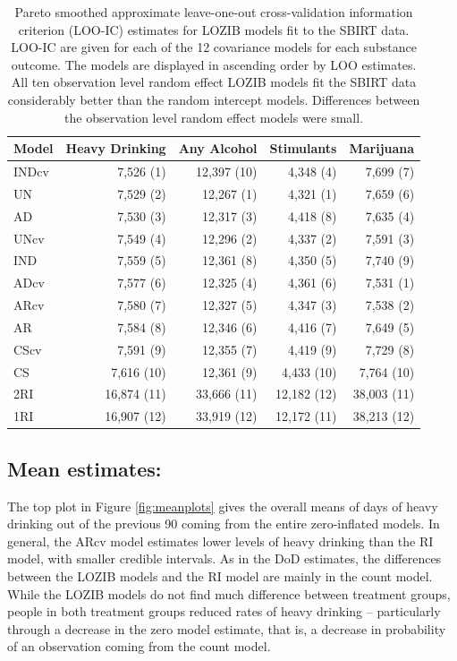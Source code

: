 \documentclass[12pt]{article}
\begin{document}
\begin{table}
	\caption{Pareto smoothed approximate leave-one-out cross-validation information criterion (LOO-IC) estimates for LOZIB models fit to the SBIRT data. LOO-IC are given for each of the 12 covariance models for each substance outcome. The models are displayed in ascending order by LOO estimates. All ten observation level random effect LOZIB models fit the SBIRT data considerably better than the random intercept models. Differences between the observation level random effect models were small.}
	\centering
	\begin{tabular}[t]{lrrrr}
		\toprule
		Model & Heavy Drinking & Any Alcohol& Stimulants & Marijuana\\
		\midrule
		INDcv & 7,526 (1) & 12,397 (10) & 4,348 (4) & 7,699 (7)\\
		UN & 7,529 (2) & 12,267 (1) & 4,321 (1) & 7,659 (6)\\
		AD & 7,530 (3) & 12,317 (3) & 4,418 (8) & 7,635 (4)\\
		UNcv & 7,549 (4) & 12,296 (2) & 4,337 (2)  & 7,591 (3)\\
		IND & 7,559 (5) & 12,361 (8) & 4,350 (5) & 7,740 (9)\\
		ADcv & 7,577 (6) & 12,325 (4) & 4,361 (6) & 7,531 (1)\\
		ARcv & 7,580 (7) & 12,327 (5) & 4,347 (3) & 7,538 (2)\\
		AR & 7,584 (8) & 12,346 (6) & 4,416 (7) & 7,649 (5)\\
		CScv & 7,591 (9) & 12,355 (7) & 4,419 (9) & 7,729 (8)\\
		CS & 7,616 (10) & 12,361 (9)& 4,433 (10) & 7,764 (10)\\
		\addlinespace
		2RI & 16,874 (11) & 33,666 (11) & 12,182 (12) & 38,003 (11)\\
		1RI & 16,907 (12) & 33,919 (12) & 12,172 (11)& 38,213 (12)\\
		\bottomrule
	\end{tabular}
	\label{tab:loo}
\end{table}


\subsection{Mean estimates:}

The top plot in Figure \ref{fig:meanplots} gives the overall means of days of heavy drinking out of the previous 90 coming from the entire zero-inflated models. In general, the ARcv model estimates lower levels of heavy drinking than the RI model, with smaller credible intervals. As in the DoD estimates, the differences between the LOZIB models and the RI model are mainly in the count model. While the LOZIB models do not find much difference between treatment groups, people in both treatment groups reduced rates of heavy drinking -- particularly through a decrease in the zero model estimate, that is, a decrease in probability of an observation coming from the count model.
\end{document}
